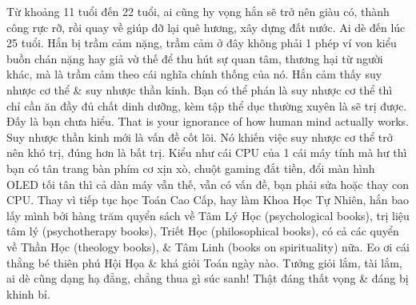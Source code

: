 \documentclass[12pt]{article}
\begin{document}
Từ khoảng 11 tuổi đến 22 tuổi, ai cũng hy vọng hắn sẽ trở nên giàu có, thành công rực rỡ, rồi quay về giúp đỡ lại quê hương, xây dựng đất nước. Ai dè đến lúc 25 tuổi. Hắn bị trầm cảm nặng, trầm cảm ở đây không phải 1 phép ví von kiểu buồn chán nặng hay giả vờ thế để thu hút sự quan tâm, thương hại từ người khác, mà là trầm cảm theo cái nghĩa chính thống của nó. Hắn cảm thấy suy nhược cơ thể \& suy nhược thần kinh. Bạn có thể phán là suy nhược cơ thể thì chỉ cần ăn đầy đủ chất dinh dưỡng, kèm tập thể dục thường xuyên là sẽ trị được. Đấy là bạn chưa hiểu. That is your ignorance of how human mind actually works. Suy nhược thần kinh mới là vấn đề cốt lõi. Nó khiến việc suy nhược cơ thể trở nên khó trị, đúng hơn là bất trị. Kiểu như cái CPU của 1 cái máy tính mà hư thì bạn có tân trang bàn phím cơ xịn xò, chuột gaming đắt tiền, đổi màn hình OLED tối tân thì cả dàn máy vẫn thế, vẫn có vấn đề, bạn phải sửa hoặc thay con CPU. Thay vì tiếp tục học Toán Cao Cấp, hay làm Khoa Học Tự Nhiên, hắn bao lấy mình bởi hàng trăm quyển sách về Tâm Lý Học (psychological books), trị liệu tâm lý (psychotherapy books), Triết Học (philosophical books), có cả các quyển về Thần Học (theology books), \& Tâm Linh (books on spirituality) nữa. Eo ơi cái thằng bé thiên phú Hội Họa \& khá giỏi Toán ngày nào. Tưởng giỏi lắm, tài lắm, ai dè cũng dạng hạ đẳng, chẳng thua gì súc sanh! Thật đáng thất vọng \& đáng bị khinh bỉ.
\end{document}

